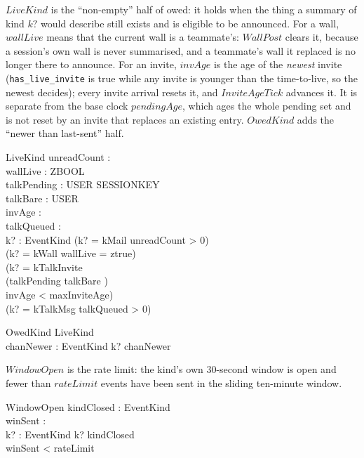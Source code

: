 \documentclass[a4paper,10pt,fleqn]{article}
\begin{document}
$LiveKind$ is the ``non-empty'' half of owed: it holds when the thing a
summary of kind $k?$ would describe still exists and is eligible to be
announced.  For a wall, $wallLive$ means that the current wall is a
teammate's: $WallPost$ clears it, because a session's own wall is never
summarised, and a teammate's wall it replaced is no longer there to announce.
For an invite, $invAge$ is the age of the \emph{newest} invite
(\texttt{has\_live\_invite} is true while any invite is younger than the
time-to-live, so the newest decides); every invite arrival resets it, and
$InviteAgeTick$ advances it.  It is separate from the base clock
$pendingAge$, which ages the whole pending set and is not reset by an
invite that replaces an existing entry.  $OwedKind$ adds the
``newer than last-sent'' half.

\begin{schema}{LiveKind}
  unreadCount : \nat \\
  wallLive : ZBOOL \\
  talkPending : USER \pfun SESSIONKEY \\
  talkBare : \power USER \\
  invAge : \nat \\
  talkQueued : \nat \\
  k? : EventKind
  \where
  (k? = kMail \land unreadCount > 0) \lor \\
  (k? = kWall \land wallLive = ztrue) \lor \\
  (k? = kTalkInvite \land \\
  \quad (\dom talkPending \neq \emptyset \lor talkBare \neq \emptyset) \land \\
  \quad invAge < maxInviteAge) \lor \\
  (k? = kTalkMsg \land talkQueued > 0)
\end{schema}

\begin{schema}{OwedKind}
  LiveKind \\
  chanNewer : \power EventKind
  \where
  k? \in chanNewer
\end{schema}

$WindowOpen$ is the rate limit: the kind's own 30-second window is open and
fewer than $rateLimit$ events have been sent in the sliding ten-minute
window.

\begin{schema}{WindowOpen}
  kindClosed : \power EventKind \\
  winSent : \nat \\
  k? : EventKind
  \where
  k? \notin kindClosed \\
  winSent < rateLimit
\end{schema}
\end{document}
